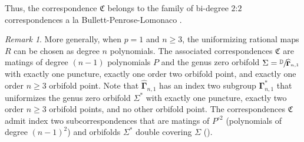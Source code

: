 \documentclass[JEP,XML,SOM,Unicode,NoFloatCountersInSection,published]{cedram}
\let\faktor\sfrac
\theoremstyle{definition}
\theoremstyle{remark}
\newtheorem{remark}[lemma]{Remark}
\newcommand{\D}{\mathbb{D}}
\begin{document}
Thus, the correspondence $\mathfrak{C}$ belongs to the family of bi-degree $2$:$2$ correspondences a la Bullett-Penrose-Lomonaco \cite{BP94,BL20a,BL20b}.

\begin{remark}
More generally, when $p=1$ and $n\geq 3$, the uniformizing rational maps $R$ can be chosen as degree $n$ polynomials. The associated correspondences $\mathfrak{C}$ are matings of degree $(n-1)$ polynomials $P$ and the genus zero orbifold $\Sigma=\faktor{\D}{\widehat{\pmb{\Gamma}}_{n,1}}$ with exactly one puncture, exactly one order two orbifold point, and exactly one order $n\geq 3$ orbifold point. Note that $\widehat{\pmb{\Gamma}}_{n,1}$ has an index two subgroup $\pmb{\Gamma}^{\ast}_{n,1}$ that uniformizes the genus zero orbifold $\Sigma^*$ with exactly one puncture, exactly two order $n\geq 3$ orbifold points, and no other orbifold point.
The correspondences $\mathfrak{C}$ admit index two subcorrespondences that are matings of $P^{\circ 2}$ (polynomials of degree $(n-1)^2$) and orbifolds $\Sigma^*$ double covering $\Sigma$ (\cf \cite[\S 4.3]{B00}).
\end{remark}

\backmatter


\end{document}
